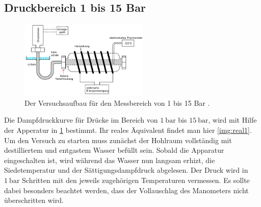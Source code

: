 \subsection{Druckbereich 1 bis 15 Bar}
\begin{figure}[H]
    \centering
    \includegraphics[width=0.55\textwidth]{images/Abbildung4.PNG}
    \caption{Der Versuchsaufbau für den Messbereich von 1 bis 15 Bar \protect \cite{V203}.}
    \label{img:aufbau2}
\end{figure}
Die Dampfdruckkurve für Drücke im Bereich von $\SI{1}{\bar}$ bis $\SI{15}{\bar}$, wird mit Hilfe der Apperatur in \ref{img:aufbau2} bestimmt. 
Ihr reales Äquivalent findet man hier \ref{img:real1}.\\
Um den Versuch zu starten muss zunächst der Hohlraum vollständig mit destilliertem und entgastem Wasser befüllt sein.
Sobald die Ap­pa­ra­tur eingeschalten ist, wird während das Wasser nun langsam erhizt, 
die Siedetemperatur und der Sättigungsdampfdruck abgelesen. Der Druck wird in $\SI{1}{\bar}$ Schritten mit den jeweils zugehörigen Temperaturen vermessen. 
Es sollte dabei besonders beachtet werden, dass der Vollauschlag des Manometers nicht überschritten wird. 